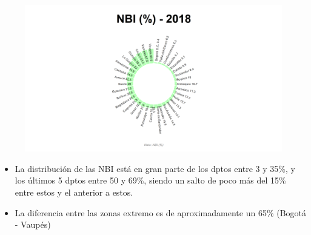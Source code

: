     \begin{figure}[H]
        \caption[Necesidades Básicas Insatisfechas por departamentos para 2018 ]{\label{nbi_dptos} }
        \begin{center}
        \includegraphics[width=\textwidth,keepaspectratio]{img/var_273_static.png}
        \end{center}
    \end{figure}
            \begin{itemize}
                    \item La distribución de las NBI está en gran parte de los dptos entre 3 y 35\%, y los últimos 5 dptos entre 50 y 69\%, siendo un salto de poco más del 15\% entre estos y el anterior a estos.
                    \item La diferencia entre las zonas extremo es de aproximadamente un 65\% (Bogotá - Vaupés)
                    \end{itemize}

